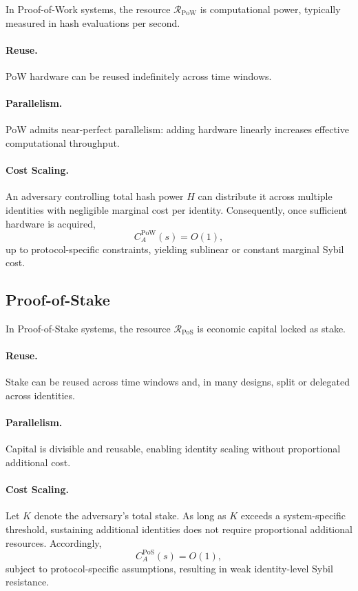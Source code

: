 \documentclass[11pt]{article}
\begin{document}
In Proof-of-Work systems, the resource
$\mathcal{R}_{\mathrm{PoW}}$ is computational power, typically measured in hash
evaluations per second.

\paragraph{Reuse.}
PoW hardware can be reused indefinitely across time windows.

\paragraph{Parallelism.}
PoW admits near-perfect parallelism: adding hardware linearly increases effective
computational throughput.

\paragraph{Cost Scaling.}
An adversary controlling total hash power $H$ can distribute it across multiple
identities with negligible marginal cost per identity. Consequently, once sufficient
hardware is acquired,
\[
C_A^{\mathrm{PoW}}(s) = O(1),
\]
up to protocol-specific constraints, yielding sublinear or constant marginal Sybil cost.

\subsection{Proof-of-Stake}
\label{subsec:pos}

In Proof-of-Stake systems, the resource
$\mathcal{R}_{\mathrm{PoS}}$ is economic capital locked as stake.

\paragraph{Reuse.}
Stake can be reused across time windows and, in many designs, split or delegated
across identities.

\paragraph{Parallelism.}
Capital is divisible and reusable, enabling identity scaling without proportional
additional cost.

\paragraph{Cost Scaling.}
Let $K$ denote the adversary’s total stake. As long as $K$ exceeds a system-specific
threshold, sustaining additional identities does not require proportional additional
resources. Accordingly,
\[
C_A^{\mathrm{PoS}}(s) = O(1),
\]
subject to protocol-specific assumptions, resulting in weak identity-level Sybil
resistance.
\end{document}
